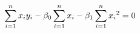 \documentclass[preview]{standalone}
\begin{document}
\begin{align*}
{{\special{dvisvgm:raw <g id='unique000'>}\sum_{i=1}^n{x_i y_i}-\beta_0\sum_{i=1}^n{x_i}}}-\beta_1\sum_{i=1}^n{{x_i}^2}=0\special{dvisvgm:raw </g>}
\end{align*}
\end{document}
